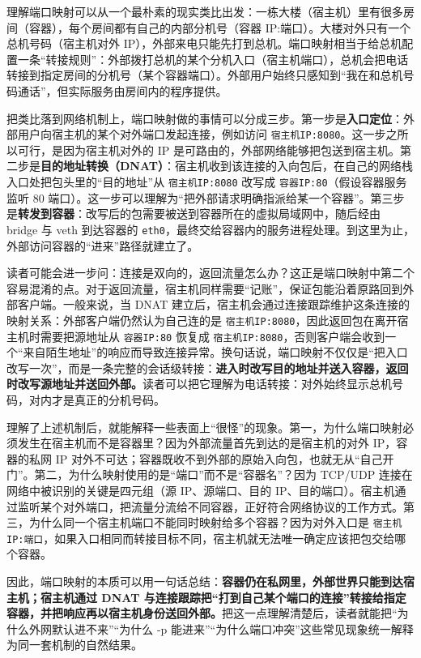 理解端口映射可以从一个最朴素的现实类比出发：一栋大楼（宿主机）里有很多房间（容器），每个房间都有自己的内部分机号（容器 IP:端口）。大楼对外只有一个总机号码（宿主机对外 IP），外部来电只能先打到总机。端口映射相当于给总机配置一条“转接规则”：外部拨打总机的某个分机入口（宿主机端口），总机会把电话转接到指定房间的分机号（某个容器端口）。外部用户始终只感知到“我在和总机号码通话”，但实际服务由房间内的程序提供。

把类比落到网络机制上，端口映射做的事情可以分成三步。第一步是\textbf{入口定位}：外部用户向宿主机的某个对外端口发起连接，例如访问 \texttt{宿主机IP:8080}。这一步之所以可行，是因为宿主机对外的 IP 是可路由的，外部网络能够把包送到宿主机。第二步是\textbf{目的地址转换（DNAT）}：宿主机收到该连接的入向包后，在自己的网络栈入口处把包头里的“目的地址”从 \texttt{宿主机IP:8080} 改写成 \texttt{容器IP:80}（假设容器服务监听 80 端口）。这一步可以理解为“把外部请求明确指派给某一个容器”。第三步是\textbf{转发到容器}：改写后的包需要被送到容器所在的虚拟局域网中，随后经由 bridge 与 veth 到达容器的 \texttt{eth0}，最终交给容器内的服务进程处理。到这里为止，外部访问容器的“进来”路径就建立了。

读者可能会进一步问：连接是双向的，返回流量怎么办？这正是端口映射中第二个容易混淆的点。对于返回流量，宿主机同样需要“记账”，保证包能沿着原路回到外部客户端。一般来说，当 DNAT 建立后，宿主机会通过连接跟踪维护这条连接的映射关系：外部客户端仍然认为自己连的是 \texttt{宿主机IP:8080}，因此返回包在离开宿主机时需要把源地址从 \texttt{容器IP:80} 恢复成 \texttt{宿主机IP:8080}，否则客户端会收到一个“来自陌生地址”的响应而导致连接异常。换句话说，端口映射不仅仅是“把入口改写一次”，而是一条完整的会话级转接：\textbf{进入时改写目的地址并送入容器，返回时改写源地址并送回外部。}读者可以把它理解为电话转接：对外始终显示总机号码，对内才是真正的分机号码。

理解了上述机制后，就能解释一些表面上“很怪”的现象。第一，为什么端口映射必须发生在宿主机而不是容器里？因为外部流量首先到达的是宿主机的对外 IP，容器的私网 IP 对外不可达；容器既收不到外部的原始入向包，也就无从“自己开门”。第二，为什么映射使用的是“端口”而不是“容器名”？因为 TCP/UDP 连接在网络中被识别的关键是四元组（源 IP、源端口、目的 IP、目的端口）。宿主机通过监听某个对外端口，把流量分流给不同容器，正好符合网络协议的工作方式。第三，为什么同一个宿主机端口不能同时映射给多个容器？因为对外入口是 \texttt{宿主机IP:端口}，如果入口相同而转接目标不同，宿主机就无法唯一确定应该把包交给哪个容器。

因此，端口映射的本质可以用一句话总结：\textbf{容器仍在私网里，外部世界只能到达宿主机；宿主机通过 DNAT 与连接跟踪把“打到自己某个端口的连接”转接给指定容器，并把响应再以宿主机身份送回外部。}把这一点理解清楚后，读者就能把“为什么外网默认进不来”“为什么 -p 能进来”“为什么端口冲突”这些常见现象统一解释为同一套机制的自然结果。

